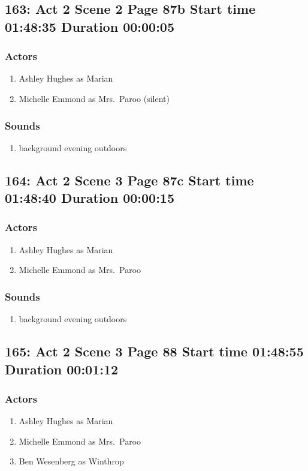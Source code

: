 \subsection{163: Act 2 Scene 2 Page 87b Start time 01:48:35 Duration 00:00:05}

\subsubsection{Actors}
\begin{enumerate}
\item Ashley Hughes as Marian
\item Michelle Emmond as Mrs.~Paroo (silent)
\end{enumerate}

\subsubsection{Sounds}
\begin{enumerate}
\item background evening outdoors
\end{enumerate}
\subsection{164: Act 2 Scene 3 Page 87c Start time 01:48:40 Duration 00:00:15}

\subsubsection{Actors}
\begin{enumerate}
\item Ashley Hughes as Marian
\item Michelle Emmond as Mrs.~Paroo
\end{enumerate}

\subsubsection{Sounds}
\begin{enumerate}
\item background evening outdoors
\end{enumerate}
\subsection{165: Act 2 Scene 3 Page 88 Start time 01:48:55 Duration 00:01:12}

\subsubsection{Actors}
\begin{enumerate}
\item Ashley Hughes as Marian
\item Michelle Emmond as Mrs.~Paroo
\item Ben Wesenberg as Winthrop
\end{enumerate}

